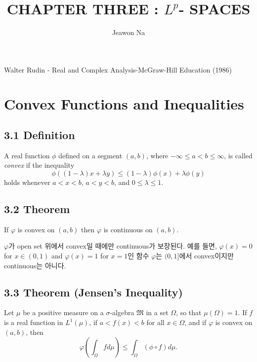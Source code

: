 \documentclass[11pt,reqno]{article}
\renewcommand{\(}{\left(}
\renewcommand{\)}{\right)}
\renewcommand{\[}{\left[}
\renewcommand{\]}{\right]}
\newcommand{\M}{\mathfrak{M}}
\begin{document}
\title{CHAPTER THREE : $L^p$- SPACES}
\author{Jeawon Na}
\date{}

\maketitle

Walter Rudin - Real and Complex Analysis-McGraw-Hill Education (1986)

\section{Convex Functions and Inequalities}

\subsection{3.1 Definition}

A real function $\phi$ defined on a segment $(a, b)$, where $-\infty \le a < b \le \infty$, is called \textit{convex}
if the inequality
\begin{equation}
  \phi ((1-\lambda) x + \lambda y) \le (1 - \lambda) \phi(x) + \lambda \phi(y)
\end{equation}
holds whenever $a < x < b$, $a < y < b$, and $0 \le \lambda \le 1$.

\subsection{3.2 Theorem}

If $\varphi$ is convex on $(a, b)$ then $\varphi$ is continuous on $(a, b)$.

$\varphi$가 open set 위에서 convex일 때에만 continuous가 보장된다. 예를 들면, $\varphi(x) = 0$ for $x \in (0, 1)$ and 
$\varphi(x) = 1$ for $x = 1$인 함수 $\varphi$는 $(0, 1]$에서 convex이지만 continuous는 아니다.

\subsection{3.3 Theorem (Jensen's Inequality)}

Let $\mu$ be a positive measure on a $\sigma$-algebra $\M$ in a set $\Omega$, so that $\mu(\Omega) = 1$. If $f$ is
a real function in $L^1 (\mu)$, if $a < f(x) < b$ for all $x \in \Omega$, and if $\varphi$ is convex on $(a, b)$, then
\begin{equation}
  \varphi \( \int_\Omega f d\mu \) \le \int_\Omega (\phi \circ f) d\mu.
\end{equation}
\end{document}
